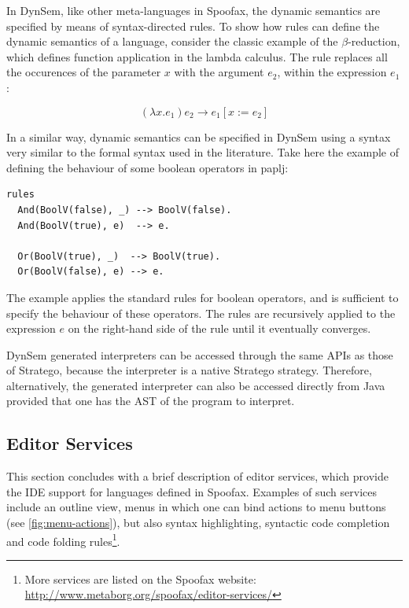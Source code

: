In DynSem, like other meta-languages in Spoofax, the dynamic semantics
are specified by means of syntax-directed rules. To show how rules can
define the dynamic semantics of a language, consider the classic
example of the \(\beta\)-reduction, which defines function application in
the lambda calculus. The rule replaces all the occurences of the
parameter \(x\) with the argument \(e_2\), within the expression \(e_1\):

\begin{equation}
(\lambda x.e_1) e_2 \rightarrow e_1[x := e_2]
\end{equation}

In a similar way, dynamic semantics can be specified in DynSem using a
syntax very similar to the formal syntax used in the literature. Take
here the example of defining the behaviour of some boolean operators
in paplj:
\lstset{language=dynsem,numbers=left}
\begin{lstlisting}
rules
  And(BoolV(false), _) --> BoolV(false).
  And(BoolV(true), e)  --> e.

  Or(BoolV(true), _)  --> BoolV(true).
  Or(BoolV(false), e) --> e.
\end{lstlisting}
The example applies the standard rules for boolean operators, and is
sufficient to specify the behaviour of these operators. The rules are
recursively applied to the expression \(e\) on the right-hand side of
the rule until it eventually converges.

DynSem generated interpreters can be accessed through the same APIs as
those of Stratego, because the interpreter is a native Stratego
strategy. Therefore, alternatively, the generated interpreter can also
be accessed directly from Java provided that one has the AST of the
program to interpret.

\lstset{numbers=none}

\subsection{Editor Services}
\label{ssec:editor-serv}
This section concludes with a brief description of editor services,
which provide the IDE support for languages defined in
Spoofax. Examples of such services include an outline view, menus in
which one can bind actions to menu buttons (see
\cref{fig:menu-actions}), but also syntax highlighting, syntactic code
completion and code folding rules\footnote{More services are
listed on the Spoofax website:
\url{http://www.metaborg.org/spoofax/editor-services/}}.

